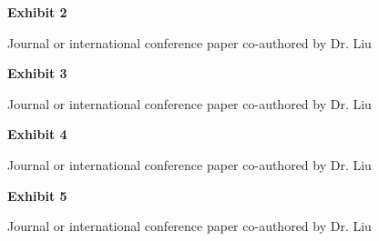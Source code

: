 \documentclass{article}
\begin{document}


\vspace*{\fill}

\begin{center}

{\LARGE \bf
Exhibit 2
}

\vspace{10\baselineskip}

{\large Journal or international conference paper co-authored by Dr. Liu}

\end{center}
\vspace*{\fill}



\vspace*{\fill}

\begin{center}

{\LARGE \bf
Exhibit 3
}

\vspace{10\baselineskip}

{\large Journal or international conference paper co-authored by Dr. Liu}

\end{center}
\vspace*{\fill}



\vspace*{\fill}

\begin{center}

{\LARGE \bf
Exhibit 4
}

\vspace{10\baselineskip}

{\large Journal or international conference paper co-authored by Dr. Liu}

\end{center}
\vspace*{\fill}



\vspace*{\fill}

\begin{center}

{\LARGE \bf
Exhibit 5
}

\vspace{10\baselineskip}

{\large Journal or international conference paper co-authored by Dr. Liu}

\end{center}
\vspace*{\fill}
\end{document}
